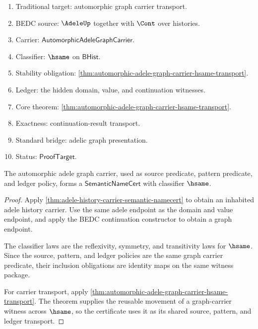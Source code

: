 \begin{enumerate}
  \item Traditional target: automorphic graph carrier transport.
  \item BEDC source: $\AdeleUp$ together with $\Cont$ over histories.
  \item Carrier: $\mathsf{AutomorphicAdeleGraphCarrier}$.
  \item Classifier: $\hsame$ on $\mathsf{BHist}$.
  \item Stability obligation:
  \autoref{thm:automorphic-adele-graph-carrier-hsame-transport}.
  \item Ledger: the hidden domain, value, and continuation witnesses.
  \item Core theorem:
  \autoref{thm:automorphic-adele-graph-carrier-hsame-transport}.
  \item Exactness: continuation-result transport.
  \item Standard bridge: adelic graph presentation.
  \item Status: $\mathsf{ProofTarget}$.
\end{enumerate}

\begin{theorem}
\label{thm:automorphic-adele-graph-semantic-namecert}
The automorphic adele graph carrier, used as source predicate, pattern
predicate, and ledger policy, forms a $\mathsf{SemanticNameCert}$ with
classifier $\hsame$.
\end{theorem}
\begin{proof}
Apply \autoref{thm:adele-history-carrier-semantic-namecert} to obtain an
inhabited adele history carrier. Use the same adele endpoint as the domain and
value endpoint, and apply the BEDC continuation constructor to obtain a graph
endpoint.

The classifier laws are the reflexivity, symmetry, and transitivity laws for
$\hsame$. Since the source, pattern, and ledger policies are the same graph
carrier predicate, their inclusion obligations are identity maps on the same
witness package.

For carrier transport, apply
\autoref{thm:automorphic-adele-graph-carrier-hsame-transport}. The theorem
supplies the reusable movement of a graph-carrier witness across $\hsame$, so
the certificate uses it as its shared source, pattern, and ledger transport.
\end{proof}

